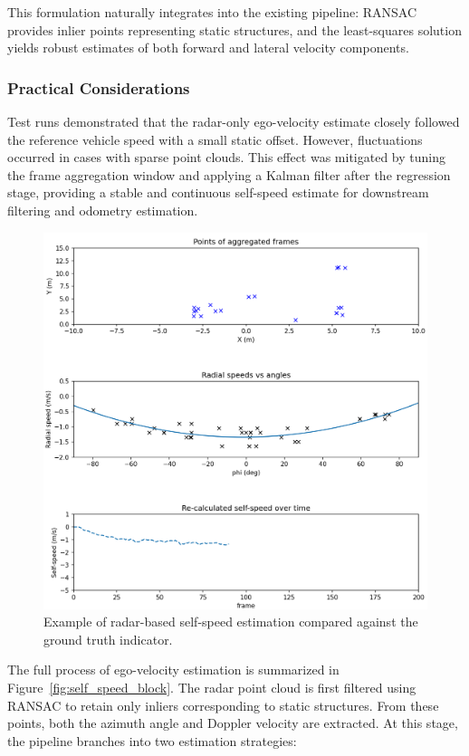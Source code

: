 This formulation naturally integrates into the existing pipeline: RANSAC provides inlier points representing static structures, and the least-squares solution yields robust estimates of both forward and lateral velocity components.  

\subsubsection*{Practical Considerations}
Test runs demonstrated that the radar-only ego-velocity estimate closely followed the reference vehicle speed with a small static offset. 
However, fluctuations occurred in cases with sparse point clouds. 
This effect was mitigated by tuning the frame aggregation window and applying a Kalman filter after the regression stage, providing a stable and continuous self-speed estimate for downstream filtering and odometry estimation.  

\begin{figure}[!htbp]
    \centering
    \includegraphics[width=1.0\linewidth]{images/self_speed_reality.png}
    \caption{Example of radar-based self-speed estimation compared against the ground truth indicator.}
    \label{fig:self_speed_test_data}
\end{figure}

\FloatBarrier\noindent
The full process of ego-velocity estimation is summarized in Figure~\ref{fig:self_speed_block}. 
The radar point cloud is first filtered using RANSAC to retain only inliers corresponding to static structures. 
From these points, both the azimuth angle and Doppler velocity are extracted. 
At this stage, the pipeline branches into two estimation strategies:  

